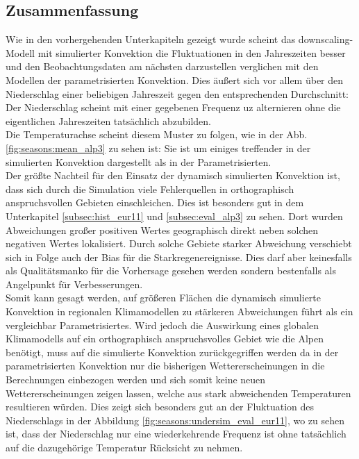 \subsection{Zusammenfassung}
Wie in den vorhergehenden Unterkapiteln gezeigt wurde scheint das downscaling-Modell mit simulierter Konvektion die Fluktuationen in den Jahreszeiten besser und den Beobachtungsdaten am nächsten darzustellen verglichen mit den Modellen der parametrisierten Konvektion. Dies äußert sich vor allem über den Niederschlag einer beliebigen Jahreszeit gegen den entsprechenden Durchschnitt: Der Niederschlag scheint mit einer gegebenen Frequenz uz alternieren ohne die eigentlichen Jahreszeiten tatsächlich abzubilden.\\
Die Temperaturachse scheint diesem Muster zu folgen, wie in der Abb.\ref{fig:seasons:mean_alp3} zu sehen ist: Sie ist um einiges treffender in der simulierten Konvektion dargestellt als in der Parametrisierten.\\
Der größte Nachteil für den Einsatz der dynamisch simulierten Konvektion ist, dass sich durch die Simulation viele Fehlerquellen in orthographisch anspruchsvollen Gebieten einschleichen. Dies ist besonders gut in dem Unterkapitel \ref{subsec:hist_eur11} und \ref{subsec:eval_alp3} zu sehen. Dort wurden Abweichungen großer positiven Wertes geographisch direkt neben solchen negativen Wertes lokalisiert. Durch solche Gebiete starker Abweichung verschiebt sich in Folge auch der Bias für die Starkregenereignisse. Dies darf aber keinesfalls als Qualitätsmanko für die Vorhersage gesehen werden sondern bestenfalls als Angelpunkt für Verbesserungen.\\
Somit kann gesagt werden, auf größeren Flächen die dynamisch simulierte Konvektion in regionalen Klimamodellen zu stärkeren Abweichungen führt als ein vergleichbar Parametrisiertes. Wird jedoch die Auswirkung eines globalen Klimamodells auf ein orthographisch anspruchsvolles Gebiet wie die Alpen benötigt, muss auf die simulierte Konvektion zurückgegriffen werden da in der parametrisierten Konvektion nur die bisherigen Wettererscheinungen in die Berechnungen einbezogen werden und sich somit keine neuen Wettererscheinungen zeigen lassen, welche aus stark abweichenden Temperaturen resultieren würden. Dies zeigt sich besonders gut an der Fluktuation des Niederschlags in der Abbildung \ref{fig:seasons:undersim_eval_eur11}, wo zu sehen ist, dass der Niederschlag nur eine wiederkehrende Frequenz ist ohne tatsächlich auf die dazugehörige Temperatur Rücksicht zu nehmen.\\